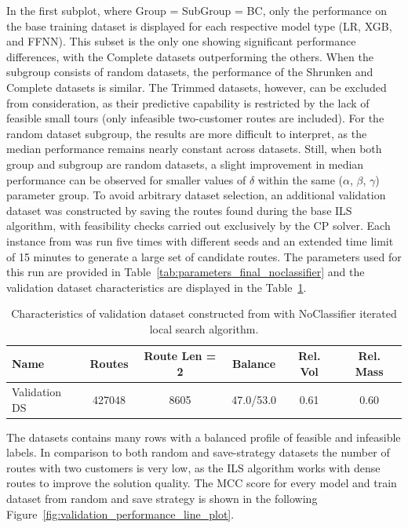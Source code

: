 In the first subplot, where Group = SubGroup = BC, only the performance on the base training dataset is
displayed for each respective model type (\gls{LR}, XGB, and \gls{FFNN}). This subset is the only one showing significant
performance differences, with the Complete datasets outperforming the others. When the subgroup consists of random datasets,
the performance of the Shrunken and Complete datasets is similar. The Trimmed datasets, however, can be excluded from consideration,
as their predictive capability is restricted by the lack of feasible small tours (only infeasible two-customer routes are included).
For the random dataset subgroup, the results are more difficult to interpret, as the median performance remains nearly constant
across datasets. Still, when both group and subgroup are random datasets, a slight improvement in median performance can
be observed for smaller values of $\delta$ within the same ($\alpha$, $\beta$, $\gamma$) parameter group. To avoid arbitrary dataset
selection, an additional validation dataset was constructed by saving the routes found during the base \gls{ILS} algorithm,
with feasibility checks carried out exclusively by the \gls{CP} solver. Each instance from \gendreauDataSetText was run
five times with different seeds and an extended time limit of 15 minutes to generate a large set of candidate routes.
The parameters used for this run are provided in Table~\ref{tab:parameters_final_noclassifier} and
the validation dataset characteristics are displayed in the Table~\ref{tab:validation_dataset_gendreau}.
\begin{table}[!ht]
	\centering
	\small
	\begin{tabular}{l c c c c c }
		\toprule
		Name          & Routes & Route Len = 2 & Balance   & Rel. Vol & Rel. Mass \\
		\midrule
		Validation DS & 427048 & 8605          & 47.0/53.0 & 0.61     & 0.60      \\
		\bottomrule
	\end{tabular}
	\caption{Characteristics of validation dataset constructed from \gendreauDataSetText with NoClassifier iterated local search algorithm.}
	\label{tab:validation_dataset_gendreau}
\end{table}

The datasets contains many rows with a balanced profile of feasible and infeasible labels. In comparison to both
random and save-strategy datasets the number of routes with two customers is very low, as the \gls{ILS} algorithm
works with dense routes to improve the solution quality. The \gls{MCC} score for every model and train dataset
from random and save strategy is shown in the following Figure~\ref{fig:validation_performance_line_plot}.

